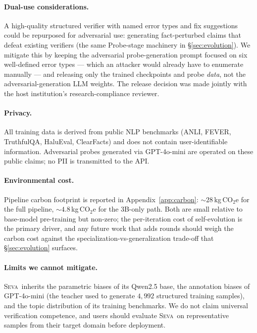 \documentclass{article}
\newcommand{\seva}{\textsc{Seva}\xspace}
\begin{document}
\paragraph{Dual-use considerations.}
A high-quality structured verifier with named error types and fix suggestions could be repurposed for adversarial use: generating fact-perturbed claims that defeat existing verifiers (the same Probe-stage machinery in \S\ref{sec:evolution}).
We mitigate this by keeping the adversarial probe-generation prompt focused on six well-defined error types --- which an attacker would already have to enumerate manually --- and releasing only the trained checkpoints and probe \emph{data}, not the adversarial-generation LLM weights.
The release decision was made jointly with the host institution's research-compliance reviewer.

\paragraph{Privacy.}
All training data is derived from public NLP benchmarks (ANLI, FEVER, TruthfulQA, HaluEval, ClearFacts) and does not contain user-identifiable information.
Adversarial probes generated via GPT-4o-mini are operated on these public claims; no PII is transmitted to the API.

\paragraph{Environmental cost.}
Pipeline carbon footprint is reported in Appendix~\ref{app:carbon}: $\sim$$28$\,kg\,CO$_2$e for the full pipeline, $\sim$$4.8$\,kg\,CO$_2$e for the 3B-only path.
Both are small relative to base-model pre-training but non-zero; the per-iteration cost of self-evolution is the primary driver, and any future work that adds rounds should weigh the carbon cost against the specialization-vs-generalization trade-off that \S\ref{sec:evolution} surfaces.

\paragraph{Limits we cannot mitigate.}
\seva\ inherits the parametric biases of its Qwen2.5 base, the annotation biases of GPT-4o-mini (the teacher used to generate $4{,}992$ structured training samples), and the topic distribution of its training benchmarks.
We do not claim universal verification competence, and users should evaluate \seva\ on representative samples from their target domain before deployment.
\end{document}
